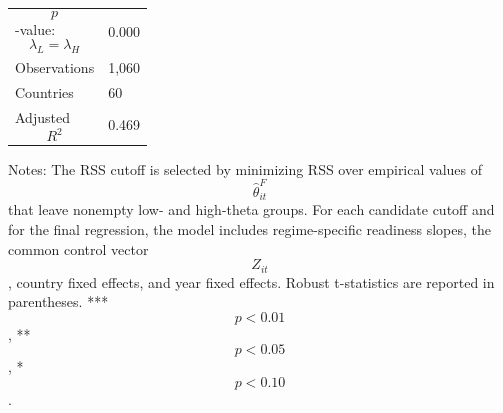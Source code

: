 \begin{table}[H]
\begin{threeparttable}
\begin{tabularx}{\textwidth}{lY}
$$p$$-value: $$\lambda_L=\lambda_H$$ & 0.000 \\
Observations & 1,060 \\
Countries & 60 \\
Adjusted $$R^2$$ & 0.469 \\
\bottomrule
\end{tabularx}
\begin{tablenotes}[flushleft]\footnotesize
\item Notes: The RSS cutoff is selected by minimizing RSS over empirical values of $$\widehat{\theta}^{F}_{it}$$ that leave nonempty low- and high-theta groups. For each candidate cutoff and for the final regression, the model includes regime-specific readiness slopes, the common control vector $$Z_{it}$$, country fixed effects, and year fixed effects. Robust t-statistics are reported in parentheses. *** $$p<0.01$$, ** $$p<0.05$$, * $$p<0.10$$.
\end{tablenotes}
\end{threeparttable}
\end{table}
